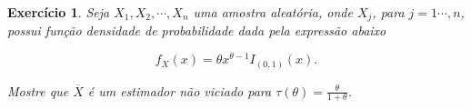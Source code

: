 \documentclass[letter,11pt]{article}
\newtheorem{exer}{Exercício}
\newcommand{\mat}[1]{\mbox{\boldmath{$#1$}}}
\begin{document}
\begin{exer} \rm 
Seja $X_1,X_2,\cdots,X_n$ uma amostra aleatória, onde $X_j$, para $j=1\cdots,n$, possui função densidade de probabilidade dada pela expressão abaixo

$$f_{X}(x)=\theta x^{\theta-1}I_{(0,1)}(x).$$

Mostre que $\overline{X}$ é um estimador não viciado para $\tau(\theta)=\frac{\theta}{1+\theta}$.

\end{exer}

%
%
\end{document}
